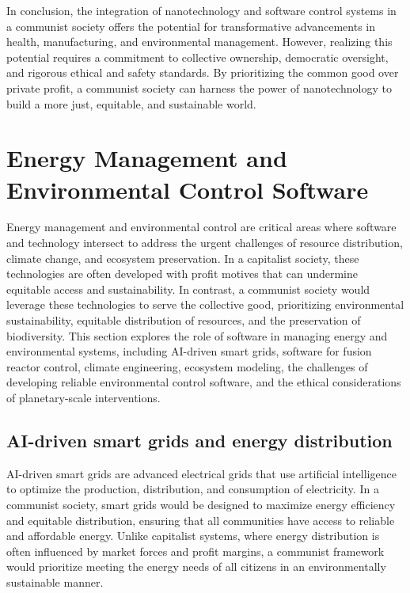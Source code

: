 In conclusion, the integration of nanotechnology and software control systems in a communist society offers the potential for transformative advancements in health, manufacturing, and environmental management. However, realizing this potential requires a commitment to collective ownership, democratic oversight, and rigorous ethical and safety standards. By prioritizing the common good over private profit, a communist society can harness the power of nanotechnology to build a more just, equitable, and sustainable world.\section{Energy Management and Environmental Control Software}

Energy management and environmental control are critical areas where software and technology intersect to address the urgent challenges of resource distribution, climate change, and ecosystem preservation. In a capitalist society, these technologies are often developed with profit motives that can undermine equitable access and sustainability. In contrast, a communist society would leverage these technologies to serve the collective good, prioritizing environmental sustainability, equitable distribution of resources, and the preservation of biodiversity. This section explores the role of software in managing energy and environmental systems, including AI-driven smart grids, software for fusion reactor control, climate engineering, ecosystem modeling, the challenges of developing reliable environmental control software, and the ethical considerations of planetary-scale interventions.

\subsection{AI-driven smart grids and energy distribution}

AI-driven smart grids are advanced electrical grids that use artificial intelligence to optimize the production, distribution, and consumption of electricity. In a communist society, smart grids would be designed to maximize energy efficiency and equitable distribution, ensuring that all communities have access to reliable and affordable energy. Unlike capitalist systems, where energy distribution is often influenced by market forces and profit margins, a communist framework would prioritize meeting the energy needs of all citizens in an environmentally sustainable manner.

